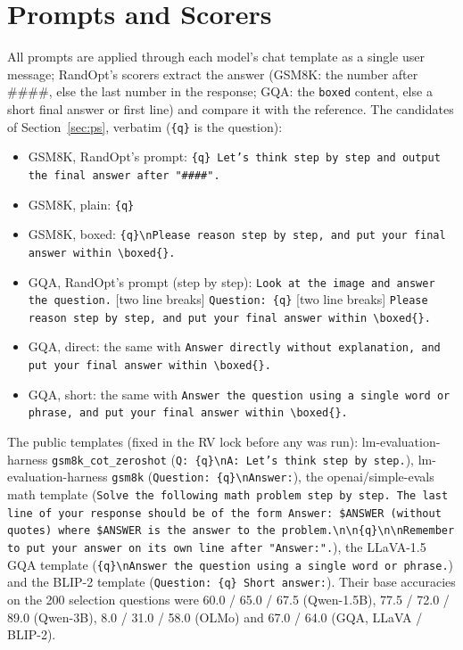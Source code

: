 \documentclass{article}
\begin{document}
\section{Prompts and Scorers}\label{app:prompts}
All prompts are applied through each model's chat template as a single user message; RandOpt's scorers extract the
answer (GSM8K: the number after \#\#\#\#, else the last number in the response; GQA: the \texttt{boxed} content, else
a short final answer or first line) and compare it with the reference. The candidates of Section~\ref{sec:ps}, verbatim
(\texttt{\{q\}} is the question):
\begin{itemize}\small
  \item GSM8K, RandOpt's prompt: \texttt{\{q\} Let's think step by step and output the final answer after "\#\#\#\#".}
  \item GSM8K, plain: \texttt{\{q\}}
  \item GSM8K, boxed: \texttt{\{q\}\textbackslash nPlease reason step by step, and put your final answer within \textbackslash boxed\{\}.}
  \item GQA, RandOpt's prompt (step by step): \texttt{Look at the image and answer the question.} [two line breaks] \texttt{Question: \{q\}} [two line breaks] \texttt{Please reason step by step, and put your final answer within \textbackslash boxed\{\}.}
  \item GQA, direct: the same with \texttt{Answer directly without explanation, and put your final answer within \textbackslash boxed\{\}.}
  \item GQA, short: the same with \texttt{Answer the question using a single word or phrase, and put your final answer within \textbackslash boxed\{\}.}
\end{itemize}
The public templates (fixed in the RV lock before any was run): lm-evaluation-harness \texttt{gsm8k\_cot\_zeroshot}
(\texttt{Q: \{q\}\textbackslash nA: Let's think step by step.}), lm-evaluation-harness \texttt{gsm8k} (\texttt{Question:
\{q\}\textbackslash nAnswer:}), the openai/simple-evals math template (\texttt{Solve the following math problem step by
step. The last line of your response should be of the form Answer: \$ANSWER (without quotes) where \$ANSWER is the
answer to the problem.\textbackslash n\textbackslash n\{q\}\textbackslash n\textbackslash nRemember to put your answer on
its own line after "Answer:".}), the LLaVA-1.5 GQA template (\texttt{\{q\}\textbackslash nAnswer the question using a
single word or phrase.}) and the BLIP-2 template (\texttt{Question: \{q\} Short answer:}). Their base accuracies on the
200 selection questions were 60.0 / 65.0 / 67.5 (Qwen-1.5B), 77.5 / 72.0 / 89.0 (Qwen-3B), 8.0 / 31.0 / 58.0 (OLMo) and
67.0 / 64.0 (GQA, LLaVA / BLIP-2).
\end{document}
